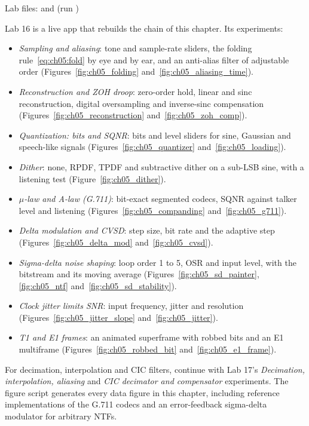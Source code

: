 \begin{labbox}
{\raggedright Lab files:  and
(run )\par}
\smallskip
\noindent Lab 16 is a live app that rebuilds the chain of this chapter. Its experiments:
\begin{itemize}
\item \emph{Sampling and aliasing}: tone and sample-rate sliders, the folding rule~\eqref{eq:ch05:fold}
by eye and by ear, and an anti-alias filter of adjustable order (Figures~\ref{fig:ch05_folding}
and~\ref{fig:ch05_aliasing_time}).
\item \emph{Reconstruction and ZOH droop}: zero-order hold, linear and sinc reconstruction, digital
oversampling and inverse-sinc compensation (Figures~\ref{fig:ch05_reconstruction}
and~\ref{fig:ch05_zoh_comp}).
\item \emph{Quantization: bits and SQNR}: bits and level sliders for sine, Gaussian and speech-like
signals (Figures~\ref{fig:ch05_quantizer} and~\ref{fig:ch05_loading}).
\item \emph{Dither}: none, RPDF, TPDF and subtractive dither on a sub-LSB sine, with a listening test
(Figure~\ref{fig:ch05_dither}).
\item \emph{$\mu$-law and A-law (G.711)}: bit-exact segmented codecs, SQNR against talker level and
listening (Figures~\ref{fig:ch05_companding} and~\ref{fig:ch05_g711}).
\item \emph{Delta modulation and CVSD}: step size, bit rate and the adaptive step
(Figures~\ref{fig:ch05_delta_mod} and~\ref{fig:ch05_cvsd}).
\item \emph{Sigma-delta noise shaping}: loop order 1 to 5, OSR and input level, with the bitstream and
its moving average (Figures~\ref{fig:ch05_sd_painter}, \ref{fig:ch05_ntf} and~\ref{fig:ch05_sd_stability}).
\item \emph{Clock jitter limits SNR}: input frequency, jitter and resolution
(Figures~\ref{fig:ch05_jitter_slope} and~\ref{fig:ch05_jitter}).
\item \emph{T1 and E1 frames}: an animated superframe with robbed bits and an E1 multiframe
(Figures~\ref{fig:ch05_robbed_bit} and~\ref{fig:ch05_e1_frame}).
\end{itemize}
For decimation, interpolation and CIC filters, continue with Lab 17's \emph{Decimation,
interpolation, aliasing} and \emph{CIC decimator and compensator} experiments. The figure script
 generates every data figure in this chapter, including
reference implementations of the G.711 codecs and an error-feedback sigma-delta modulator for
arbitrary NTFs.
\end{labbox}

